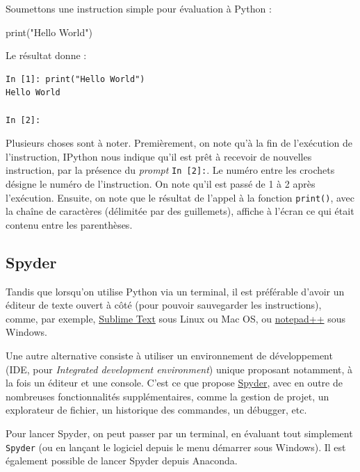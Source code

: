 \documentclass[12pt,]{book}
\newenvironment{Shaded}{\begin{snugshade}}{\end{snugshade}}
\newcommand{\StringTok}[1]{\textcolor[rgb]{0.31,0.60,0.02}{#1}}
\newcommand{\BuiltInTok}[1]{#1}
\newcommand{\NormalTok}[1]{#1}
\numberwithin{equation}{section}
\numberwithin{countremarque}{section}
\begin{document}
Soumettons une instruction simple pour évaluation à Python :

\begin{Shaded}
\begin{Highlighting}[]
\BuiltInTok{print}\NormalTok{(}\StringTok{"Hello World"}\NormalTok{)}
\end{Highlighting}
\end{Shaded}

Le résultat donne :

\begin{lstlisting}
In [1]: print("Hello World")
Hello World

In [2]:
\end{lstlisting}

Plusieurs choses sont à noter. Premièrement, on note qu'à la fin de
l'exécution de l'instruction, IPython nous indique qu'il est prêt à
recevoir de nouvelles instruction, par la présence du \emph{prompt}
\texttt{In\ {[}2{]}:}. Le numéro entre les crochets désigne le numéro de
l'instruction. On note qu'il est passé de 1 à 2 après l'exécution.
Ensuite, on note que le résultat de l'appel à la fonction
\texttt{print()}, avec la chaîne de caractères (délimitée par des
guillemets), affiche à l'écran ce qui était contenu entre les
parenthèses.

\subsection{Spyder}\label{spyder}

Tandis que lorsqu'on utilise Python via un terminal, il est préférable
d'avoir un éditeur de texte ouvert à côté (pour pouvoir sauvegarder les
instructions), comme, par exemple,
\href{https://www.sublimetext.com/}{Sublime Text} sous Linux ou Mac OS,
ou \href{https://notepad-plus-plus.org/}{notepad++} sous Windows.

Une autre alternative consiste à utiliser un environnement de
développement (IDE, pour \emph{Integrated development environment})
unique proposant notamment, à la fois un éditeur et une console. C'est
ce que propose \href{https://www.spyder-ide.org/}{Spyder}, avec en outre
de nombreuses fonctionnalités supplémentaires, comme la gestion de
projet, un explorateur de fichier, un historique des commandes, un
débugger, etc.

Pour lancer Spyder, on peut passer par un terminal, en évaluant tout
simplement \texttt{Spyder} (ou en lançant le logiciel depuis le menu
démarrer sous Windows). Il est également possible de lancer Spyder
depuis Anaconda.
\end{document}
